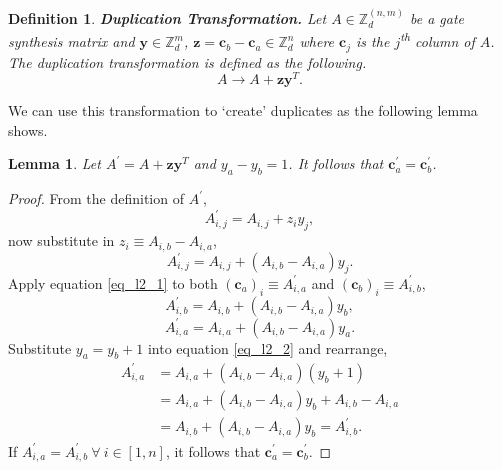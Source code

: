 \documentclass[11pt,a4paper]{article}
\newtheorem{definition}{Definition}
\newtheorem{lemma}{Lemma}
\begin{document}
	\begin{definition}
		\label{def_duptra}
		\textbf{Duplication Transformation. } Let $A\in \mathbb{Z}_d^{(n,m)}$ be a gate synthesis matrix and $\mathbf{y} \in \mathbb{Z}_d^m$, $\mathbf{z} = \mathbf{c}_{b} - \mathbf{c}_{a} \in \mathbb{Z}_d^n$ where $\mathbf{c}_j$ is the $j$\textsuperscript{th} column of $A$. The duplication transformation is defined as the following.
		\begin{equation}
		A \rightarrow A + \mathbf{z}\mathbf{y}^T.
		\end{equation}
	\end{definition}
	We can use this transformation to `create' duplicates as the following lemma shows.
	\begin{lemma}
		\label{lem_duptra}
		Let $A^\prime = A + \mathbf{z}\mathbf{y}^T$ and $y_a - y_b = 1$. It follows that $\mathbf{c}^\prime_a=\mathbf{c}^\prime_b$.
	\end{lemma}
	\begin{proof}
		From the definition of $A^\prime$,
		\begin{equation}
		A^\prime_{i,j} = A_{i,j} + z_iy_j,
		\end{equation}
		now substitute in $z_i \equiv A_{i,b} - A_{i,a}$,
		\begin{equation}
		\label{eq_l2_1}
		A^\prime_{i,j} = A_{i,j} + (A_{i,b} - A_{i,a})y_j.
		\end{equation}
		Apply equation \eqref{eq_l2_1} to both $(\mathbf{c}_a)_i \equiv A^\prime_{i,a}$ and $(\mathbf{c}_b)_i \equiv A^\prime_{i,b}$,
		\begin{equation}
		A^\prime_{i,b} = A_{i,b} + (A_{i,b} - A_{i,a})y_b,
		\end{equation}
		\begin{equation}
		\label{eq_l2_2}
		A^\prime_{i,a} = A_{i,a} + (A_{i,b} - A_{i,a})y_a.
		\end{equation}
		Substitute $y_a = y_b + 1$ into equation \eqref{eq_l2_2} and rearrange,
		\begin{align}
		A^\prime_{i,a} &= A_{i,a} + (A_{i,b} - A_{i,a})(y_b + 1) \\
		&= A_{i,a} + (A_{i,b} - A_{i,a})y_b + A_{i,b} - A_{i,a} \\
		&= A_{i,b} + (A_{i,b} - A_{i,a})y_b = A^\prime_{i,b}.
		\end{align}
		If $A^\prime_{i,a} = A^\prime_{i,b} \ \forall \ i \in [1,n]$, it follows that $\mathbf{c}^\prime_{a} = \mathbf{c}^\prime_{b}$.
	\end{proof}
\end{document}
